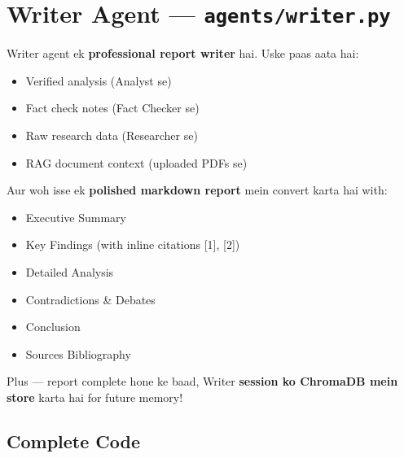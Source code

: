 \documentclass[12pt, a4paper]{article}
\begin{document}
\newpage
\section{Writer Agent --- \texttt{agents/writer.py}}

\begin{storybox}
Writer agent ek \textbf{professional report writer} hai. Uske paas aata hai:
\begin{itemize}
\item Verified analysis (Analyst se)
\item Fact check notes (Fact Checker se)
\item Raw research data (Researcher se)
\item RAG document context (uploaded PDFs se)
\end{itemize}
Aur woh isse ek \textbf{polished markdown report} mein convert karta hai with:
\begin{itemize}
\item Executive Summary
\item Key Findings (with inline citations [1], [2])
\item Detailed Analysis
\item Contradictions \& Debates
\item Conclusion
\item Sources Bibliography
\end{itemize}
Plus --- report complete hone ke baad, Writer \textbf{session ko ChromaDB mein store} karta hai for future memory!
\end{storybox}

\subsection{Complete Code}
\end{document}
